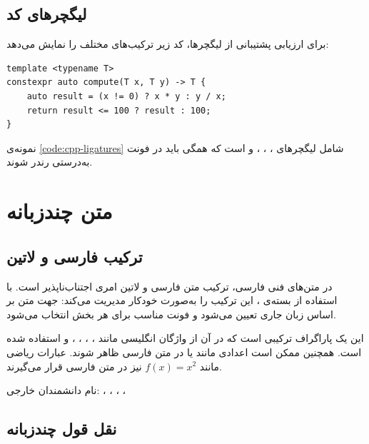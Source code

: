 \documentclass{matinbook}
\begin{document}
\section{لیگچرهای کد}
\label{sec:font-code-ligatures}

برای ارزیابی پشتیبانی از لیگچرها، کد زیر ترکیب‌های مختلف را
نمایش می‌دهد:

\begin{latin}
\begin{verbatim}
template <typename T>
constexpr auto compute(T x, T y) -> T {
    auto result = (x != 0) ? x * y : y / x;
    return result <= 100 ? result : 100;
}
\end{verbatim}
\end{latin}
\label{code:cpp-ligatures}

نمونه‌ی \cref{code:cpp-ligatures} شامل لیگچرهای \lr{<=}،
\lr{!=}، \lr{->}،  و \lr{:} است که همگی باید در فونت
 به‌درستی رندر شوند.

\chapter{متن چندزبانه}
\label{chap:multilingual}

\section{ترکیب فارسی و لاتین}
\label{sec:multilingual-mixing}

در متن‌های فنی فارسی، ترکیب متن فارسی و لاتین امری اجتناب‌ناپذیر
است.  با استفاده از بسته‌ی ، این
ترکیب را به‌صورت خودکار مدیریت می‌کند: جهت متن بر اساس زبان
جاری تعیین می‌شود و فونت مناسب برای هر بخش انتخاب می‌شود.

این یک پاراگراف ترکیبی است که در آن از واژگان انگلیسی
مانند ، ، ، ،
 و  استفاده شده است.
همچنین ممکن است اعدادی مانند  یا 
در متن فارسی ظاهر شوند. عبارات ریاضی مانند $f(x) = x^{2}$
نیز در متن فارسی قرار می‌گیرند.

نام دانشمندان خارجی: ، ،
، ، 

\section{نقل قول چندزبانه}
\label{sec:multilingual-quotes}
\end{document}
